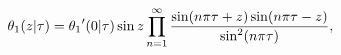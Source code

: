 \[\mathop{\theta_{1}\/}\nolimits\!\left(z\middle|\tau\right)=\mathop{\theta_{1}%
\/}\nolimits'\!\left(0\middle|\tau\right)\mathop{\sin\/}\nolimits z\prod_{n=1}%
^{\infty}\frac{\mathop{\sin\/}\nolimits\!\left(n\pi\tau+z\right)\mathop{\sin\/%
}\nolimits\!\left(n\pi\tau-z\right)}{{\mathop{\sin\/}\nolimits^{2}}\!\left(n%
\pi\tau\right)},\]